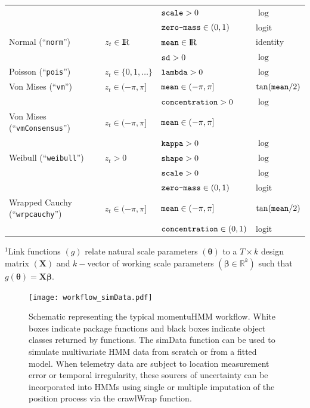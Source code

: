 \documentclass[12pt]{article}\usepackage[]{graphicx}\usepackage[]{color}
\begin{document}
\begin{table}
\begin{tabular}{llll}
                                       &                          & $\verb|scale|>0$                 &  $\log$ \tabularnewline  
                                       &                          & $\verb|zero-mass|\in(0,1)$       &  $\text{logit}$ \tabularnewline 
  Normal (``\verb|norm|'')             & $z_t\in{\rm I\!R}$       & $\verb|mean|\in{\rm I\!R}$       &  identity \tabularnewline  
                                       &                          & $\verb|sd|>0$                    &  $\log$ \tabularnewline 
  Poisson (``\verb|pois|'')            & $z_t\in\{0,1,\ldots\}$   & $\verb|lambda|>0$                &  $\log$ \tabularnewline  
  Von Mises (``\verb|vm|'')            & $z_t\in(-\pi,\pi]$       & $\verb|mean|\in(-\pi,\pi]$       &  $\tan(\verb|mean|/2)$ \tabularnewline  
                                       &                          & $\verb|concentration|>0$         &  $\log$ \tabularnewline 
  Von Mises (``\verb|vmConsensus|'')   & $z_t\in(-\pi,\pi]$       & $\verb|mean|\in(-\pi,\pi]$       &  \cite{RivestEtAl2016} \tabularnewline  
                                       &                          & $\verb|kappa|>0$                 &  $\log$ \tabularnewline 
  Weibull (``\verb|weibull|'')         & $z_t>0$                  & $\verb|shape|>0$                 &  $\log$ \tabularnewline  
                                       &                          & $\verb|scale|>0$                 &  $\log$ \tabularnewline  
                                       &                          & $\verb|zero-mass|\in(0,1)$       &  $\text{logit}$ \tabularnewline 
  Wrapped Cauchy (``\verb|wrpcauchy|'')& $z_t\in(-\pi,\pi]$       & $\verb|mean|\in(-\pi,\pi]$       &  $\tan(\verb|mean|/2)$ \tabularnewline  
                                       &                          & $\verb|concentration|\in(0,1)$ &  $\text{logit}$ \tabularnewline 
  \bottomrule
  \end{tabular}
  \footnotesize{$^1$Link functions $(g)$ relate natural scale parameters $({\boldsymbol \theta})$ to a $T \times k$ design matrix $({\mathbf X})$ and $k-$vector of working scale parameters $(\boldsymbol{\beta}\in \mathbb{R}^k)$ such that $g({\boldsymbol \theta})={\mathbf X}\boldsymbol{\beta}$.}
\end{table}

\begin{figure}[htbp]
  \centering
  \texttt{[image: workflow\_simData.pdf]}
  \caption{Schematic representing the typical momentuHMM workflow. White boxes indicate package functions and black boxes indicate object classes returned by functions. The simData function can be used to simulate multivariate HMM data from scratch or from a fitted model. When telemetry data are subject to location measurement error or temporal irregularity, these sources of uncertainty can be incorporated into HMMs using single or multiple imputation of the position process via the crawlWrap function.}
  \label{fig:workflow}
\end{figure}
\end{document}
